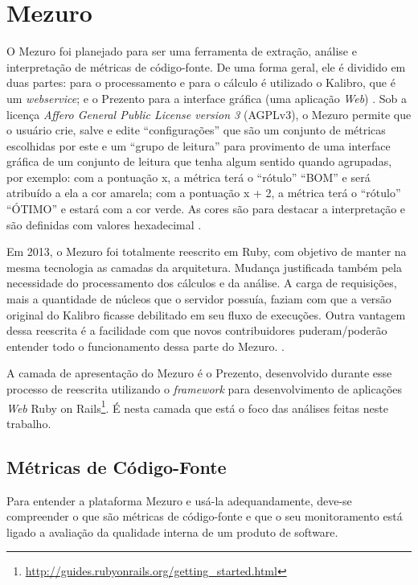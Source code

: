 \chapter{Mezuro}

O Mezuro foi planejado para ser uma ferramenta de extração, análise e
interpretação de métricas de código-fonte. De uma forma geral, ele é dividido
em duas partes: para o processamento e para o cálculo é utilizado o Kalibro, que
é um \textit{webservice}; e o Prezento para a interface gráfica (uma aplicação
\textit{Web}) \cite{meirellesCibse2015}. Sob a licença
\textit{Affero General Public License version 3} (AGPLv3), o Mezuro permite que
o usuário crie, salve e edite ``configurações'' que são um conjunto de
métricas escolhidas por este e um ``grupo de leitura'' para provimento de uma
interface gráfica de um conjunto de leitura que tenha algum sentido quando
agrupadas, por exemplo: com a pontuação x, a métrica terá o ``rótulo'' ``BOM'' e
será atribuído a ela a cor amarela; com a pontuação x + 2, a métrica terá o
``rótulo'' ``ÓTIMO'' e estará com a cor verde. As cores são para destacar a
interpretação e são definidas com valores hexadecimal \cite{camarinhaOSS2015}.

Em 2013, o Mezuro foi totalmente reescrito em Ruby, com objetivo de manter na
mesma tecnologia as camadas da arquitetura. Mudança justificada também pela
necessidade do processamento dos cálculos e da análise. A carga de requisições,
mais a quantidade de núcleos que o servidor possuía, faziam com que a versão
original do Kalibro ficasse debilitado em seu fluxo de execuções. Outra vantagem
dessa reescrita é a facilidade com que novos contribuidores puderam/poderão
entender todo o funcionamento dessa parte do Mezuro. \cite{meirellesCibse2015}.

A camada de apresentação do Mezuro é o Prezento, desenvolvido durante esse
processo de reescrita utilizando o \textit{framework} para desenvolvimento de
aplicações \textit{Web} Ruby on
Rails\footnote{\url{http://guides.rubyonrails.org/getting_started.html}}.
%
É nesta camada que está o foco das análises feitas neste trabalho.

\section{Métricas de Código-Fonte}

Para entender a plataforma Mezuro e usá-la adequandamente, deve-se compreender
o que são métricas de código-fonte e que o seu monitoramento está ligado a
avaliação da qualidade interna de um produto de software.

